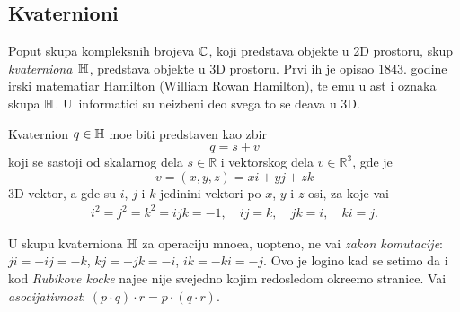 \subsection{Kvaternioni}

\def\uv{{u}}
\def\vp{{\vec v}}
\def\norm#1{{\vert#1\vert}}
\def\con#1{{\bar#1}}

Poput skupa kompleksnih brojeva ${\mathbb C}$, koji predstav{\lj}a objekte u 2D prostoru,
skup {\sl kvater\-niona\/}~${\mathbb H}$, predstav{\lj}a objekte u 3D prostoru. Prvi ih je opisao 
1843. godine irski ma\-te\-ma\-ti\-{\cv}ar
Hamilton (William Rowan Hamilton), te {\nj}emu u {\cv}ast i oznaka skupa ${\mathbb H}$.
U~informatici su neizbe{\zv}ni deo svega {\sv}to se de{\sv}ava u 3D.

\medskip

Kvaternion $q\in{\mathbb H}$ mo{\zv}e biti predstav{\lj}en kao zbir
\begin{equation}
    q=s+v
\end{equation}
koji se sastoji od skalarnog dela $s\in{\mathbb R}$ i vektorskog dela $v\in{\mathbb R}^3$, gde je
\begin{equation}
    v=(x,y,z)=xi+yj+zk
\end{equation}
3D vektor, 
a gde su $i$, $j$ i $k$ jedini{\cv}ni vektori po $x$, $y$ i $z$ osi,
za koje va{\zv}i
\begin{gather}\label{eq:qunits}
    i^2=j^2=k^2=ijk=-1,\quad
    ij=k,\quad jk=i,\quad ki=j. 
\end{gather}

\danger U skupu kvaterniona ${\mathbb H}$ za operaciju mno{\zv}e{\nj}a, uop{\sv}teno, ne va{\zv}i {\sl zakon komutacije}:
$ji=-ij=-k$, $kj=-jk=-i$, $ik=-ki=-j$.
Ovo je logi{\cv}no kad se setimo da i kod
{\sl Rubikove kocke\/} naj{\cv}e{\sv}{\cc}e nije svejedno kojim redosledom okre{\cc}emo stranice.
Va{\zv}i {\sl asocijativnost}: $(p\cdot q)\cdot r=p\cdot(q\cdot r)$.

\medskip

